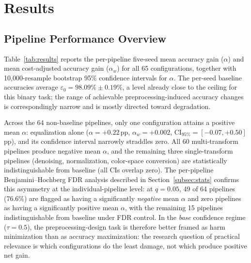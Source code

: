 \documentclass[preprint,5p,times,twocolumn]{elsarticle}
\begin{document}
\section{Results}
\label{sec:results}

\subsection{Pipeline Performance Overview}
\label{subsec:results_overview}

Table~\ref{tab:results} reports the per-pipeline five-seed mean accuracy gain ($\alpha$) and mean cost-adjusted accuracy gain ($\alpha_w$) for all 65 configurations, together with 10{,}000-resample bootstrap 95\% confidence intervals for $\alpha$. The per-seed baseline accuracies average $\varepsilon_0 = 98.09\% \pm 0.19\%$, a level already close to the ceiling for this binary task; the range of achievable preprocessing-induced accuracy changes is correspondingly narrow and is mostly directed toward degradation.

Across the 64 non-baseline pipelines, only one configuration attains a positive mean $\alpha$: equalization alone ($\alpha = +0.22$\,pp, $\alpha_w = +0.002$, CI$_{95\%} = [-0.07, +0.50]$\,pp), and its confidence interval narrowly straddles zero. All 60 multi-transform pipelines produce negative mean $\alpha$, and the remaining three single-transform pipelines (denoising, normalization, color-space conversion) are statistically indistinguishable from baseline (all CIs overlap zero). The per-pipeline Benjamini--Hochberg FDR analysis described in Section~\ref{subsec:stats} confirms this asymmetry at the individual-pipeline level: at $q = 0.05$, 49 of 64 pipelines (76.6\%) are flagged as having a significantly \emph{negative} mean $\alpha$ and zero pipelines as having a significantly positive mean $\alpha$, with the remaining 15 pipelines indistinguishable from baseline under FDR control. In the \emph{base} confidence regime ($\tau = 0.5$), the preprocessing-design task is therefore better framed as harm minimization than as accuracy maximization: the research question of practical relevance is which configurations do the least damage, not which produce positive net gain.
\end{document}
